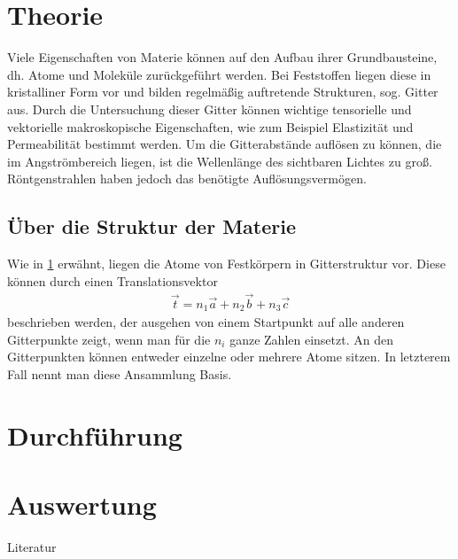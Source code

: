 

\section{Theorie}\label{sec:theorie}
Viele Eigenschaften von Materie können auf den Aufbau ihrer Grundbausteine, dh. Atome und Moleküle zurückgeführt werden. Bei Feststoffen liegen diese in kristalliner Form vor und bilden regelmäßig auftretende Strukturen, sog. Gitter aus. Durch die Untersuchung dieser Gitter können wichtige tensorielle und vektorielle makroskopische Eigenschaften, wie zum Beispiel Elastizität und Permeabilität bestimmt werden. Um die Gitterabstände auflösen zu können, die im Angströmbereich liegen, ist die Wellenlänge des sichtbaren Lichtes zu groß. Röntgenstrahlen haben jedoch das benötigte Auflösungsvermögen.

\subsection{Über die Struktur der Materie}
Wie in \ref{sec:theorie} erwähnt, liegen die Atome von Festkörpern in Gitterstruktur vor. Diese können durch einen Translationsvektor
\begin{align}
	\vec{t} = n_1\vec{a} +n_2\vec{b} + n_3\vec{c}
\end{align}
beschrieben werden, der ausgehen von einem Startpunkt auf alle anderen Gitterpunkte zeigt, wenn man für die $n_i$ ganze Zahlen einsetzt. An den Gitterpunkten können entweder einzelne oder mehrere Atome sitzen. In letzterem Fall nennt man diese Ansammlung Basis. 


\section{Durchführung}

\section{Auswertung}

\parskip 340pt
\Large{Literatur}\\\\





